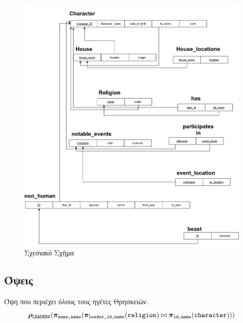 \documentclass[../main.tex]{subfiles}
\begin{document}
\begin{figure}[H]
	\includegraphics[width=\textwidth]{../images/relation_diagram.png}
	\caption{Σχεσιακό Σχήμα}
\end{figure}

\subsection{Όψεις}

\newcommand{\tsub}[1]{\tiny\texttt{#1}}

Όψη που περιέχει όλους τους ηγέτες Θρησκειών.
\begin{equation}
	\bm{\rho}_{\tsub{LEADERS}}
	(
	\bm{\pi}_{\tsub{name,name}} (
	\bm{\pi}_{\tsub{leader\_id,name}}(\texttt{religion})
	\bowtie
	\bm{\pi}_{\tsub{id,name}}(\texttt{character})
	))
\end{equation}
\end{document}
